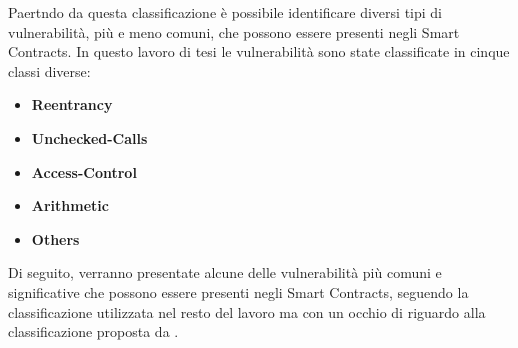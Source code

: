 \documentclass[../../Thesis.tex]{subfiles}
\begin{document}
Paertndo da questa classificazione è possibile identificare diversi tipi di vulnerabilità, più e meno comuni, che possono essere presenti negli Smart Contracts. In questo lavoro di tesi le vulnerabilità sono state classificate in cinque classi diverse:
\begin{itemize}
    \item \textbf{Reentrancy}
    \item \textbf{Unchecked-Calls}
    \item \textbf{Access-Control}
    \item \textbf{Arithmetic}
    \item \textbf{Others}
\end{itemize}

Di seguito, verranno presentate alcune delle vulnerabilità più comuni e significative che possono essere presenti negli Smart Contracts, seguendo la classificazione utilizzata nel resto del lavoro ma con un occhio di riguardo alla classificazione proposta da \cite{sc-vulnerabilities}.
\end{document}
